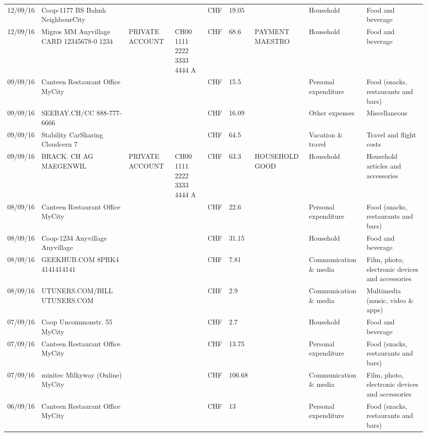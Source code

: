 \begin{landscape}
\begin{table}[t]
\begin{center}
\begin{tabular}{lllllllll}
		12/09/16 & Coop-1177 BS Bahnh       NeighbourCity &       &       & CHF   & 19.05 &       & Household & Food and beverage \\
		12/09/16 & Migros MM Anyvillage CARD 12345678-0 1234 & PRIVATE ACCOUNT & CH00 1111 2222 3333 4444 A & CHF   & 68.6  & PAYMENT MAESTRO & Household & Food and beverage \\
		09/09/16 & Canteen Restaurant Office      MyCity &       &       & CHF   & 15.5  &       & Personal expenditure & Food (snacks, restaurants and bars) \\
		09/09/16 & SEEBAY.CH/CC               888-777-6666 &       &       & CHF   & 16.09 &       & Other expenses & Miscellaneous \\
		09/09/16 & Stability CarSharing      Cloudcern 7 &       &       & CHF   & 64.5  &       & Vacation \& travel & Travel and flight costs \\
		09/09/16 & BRACK. CH AG MAEGENWIL & PRIVATE ACCOUNT & CH00 1111 2222 3333 4444 A & CHF   & 63.3  & HOUSEHOLD GOOD & Household & Household articles and accessories \\
		08/09/16 & Canteen Restaurant Office      MyCity &       &       & CHF   & 22.6  &       & Personal expenditure & Food (snacks, restaurants and bars) \\
		08/09/16 & Coop-1234 Anyvillage    Anyvillage &       &       & CHF   & 31.15 &       & Household & Food and beverage \\
		08/09/16 & GEEKHUB.COM  8PRK4        4141414141 &       &       & CHF   & 7.81  &       & Communication \& media & Film, photo, electronic devices and accessories \\
		08/09/16 & UTUNERS.COM/BILL          UTUNERS.COM &       &       & CHF   & 2.9   &       & Communication \& media & Multimedia (music, video \& apps) \\
		07/09/16 & Coop Uncommonstr. 55   MyCity &       &       & CHF   & 2.7   &       & Household & Food and beverage \\
		07/09/16 & Canteen Restaurant Office      MyCity &       &       & CHF   & 13.75 &       & Personal expenditure & Food (snacks, restaurants and bars) \\
		07/09/16 & minitec Milkyway (Online) MyCity &       &       & CHF   & 106.68 &       & Communication \& media & Film, photo, electronic devices and accessories \\
		06/09/16 & Canteen Restaurant Office      MyCity &       &       & CHF   & 13    &       & Personal expenditure & Food (snacks, restaurants and bars) \\

\end{tabular}
\end{center}
\end{table}
\end{landscape}
